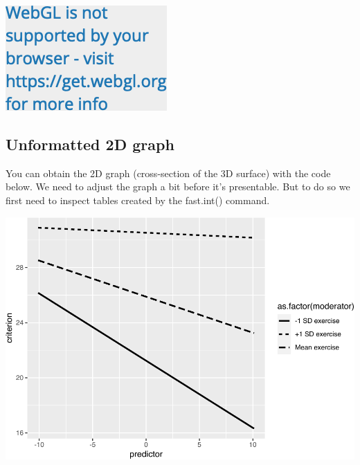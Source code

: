 \documentclass[
]{krantz}
\makeatletter
\newenvironment{Shaded}{\begin{snugshade}}{\end{snugshade}}
\newcommand{\FunctionTok}[1]{\textcolor[rgb]{0,0,0}{#1}}
\newcommand{\NormalTok}[1]{#1}
\newcommand{\OtherTok}[1]{\textcolor[rgb]{0.37,0.37,0.37}{#1}}
\newcommand{\SpecialCharTok}[1]{\textcolor[rgb]{0,0,0}{#1}}
\newenvironment{kframe}{%
\medskip{}
\setlength{\fboxsep}{.8em}
 \def\at@end@of@kframe{}%
 \ifinner\ifhmode%
  \def\at@end@of@kframe{\end{minipage}}%
  \begin{minipage}{\columnwidth}%
 \fi\fi%
 \def\FrameCommand##1{\hskip\@totalleftmargin \hskip-\fboxsep
 \colorbox{shadecolor}{##1}\hskip-\fboxsep
     \hskip-\linewidth \hskip-\@totalleftmargin \hskip\columnwidth}%
 \MakeFramed {\advance\hsize-\width
   \@totalleftmargin\z@ \linewidth\hsize
   \@setminipage}}%
 {\par\unskip\endMakeFramed%
 \at@end@of@kframe}
\renewenvironment{Shaded}{\begin{kframe}}{\end{kframe}}
\makeatother
\begin{document}
\begin{Shaded}
\end{Shaded}

\includegraphics{bookdown_files/figure-latex/unnamed-chunk-488-1.png}

\hypertarget{unformatted-2d-graph}{%
\subsection{Unformatted 2D graph}\label{unformatted-2d-graph}}

You can obtain the 2D graph (cross-section of the 3D surface) with the code below. We need to adjust the graph a bit before it's presentable. But to do so we first need to inspect tables created by the fast.int() command.

\begin{Shaded}
\end{Shaded}

\includegraphics{bookdown_files/figure-latex/unnamed-chunk-489-1.pdf}
\end{document}
